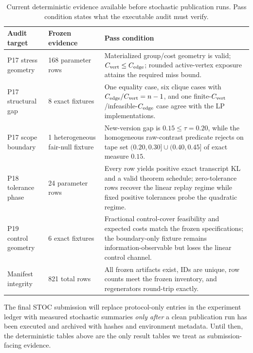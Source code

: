 \begin{table}[H]
\centering
\caption{Current deterministic evidence available before stochastic publication
runs. Pass condition states what the executable audit must verify.}
\label{tab:deterministic-evidence}
\small
\begin{tabular}{@{}p{}p{}p{}@{}}
\toprule
Audit target & Frozen evidence & Pass condition \\
\midrule
P17 stress geometry & 168 parameter rows & Materialized group/cost geometry is valid; $C_{\rm vert}\le C_{\rm edge}$; rounded active-vertex exposure attains the required miss bound. \\
P17 structural gap & 8 exact fixtures & One equality case, six clique cases with $C_{\rm edge}/C_{\rm vert}=n-1$, and one finite-$C_{\rm vert}$/infeasible-$C_{\rm edge}$ case agree with the LP implementations. \\
P17 scope boundary & 1 heterogeneous fair-null fixture & New-version gap is $0.15\le\tau=0.20$, while the homogeneous raw-contrast predicate rejects on tape set $(0.20,0.30]\cup(0.40,0.45]$ of exact measure $0.15$. \\
P18 tolerance phase & 24 parameter rows & Every row yields positive exact transcript KL and a valid theorem schedule; zero-tolerance rows recover the linear replay regime while fixed positive tolerances probe the quadratic regime. \\
P19 control geometry & 6 exact fixtures & Fractional control-cover feasibility and expected costs match the frozen specifications; the boundary-only fixture remains information-observable but loses the linear control channel. \\
Manifest integrity & 821 total rows & All frozen artifacts exist, IDs are unique, row counts meet the frozen inventory, and regenerators round-trip exactly. \\
\bottomrule
\end{tabular}
\end{table}



The final STOC submission will replace protocol-only entries in the experiment
ledger with measured stochastic summaries \emph{only after} a clean publication
run has been executed and archived with hashes and environment metadata. Until
then, the deterministic tables above are the only result tables we treat as
submission-facing evidence.
